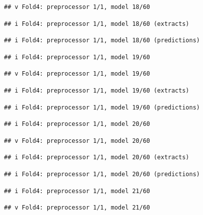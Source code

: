 \documentclass[
]{article}
\begin{document}
\begin{verbatim}
## v Fold4: preprocessor 1/1, model 18/60
\end{verbatim}

\begin{verbatim}
## i Fold4: preprocessor 1/1, model 18/60 (extracts)
\end{verbatim}

\begin{verbatim}
## i Fold4: preprocessor 1/1, model 18/60 (predictions)
\end{verbatim}

\begin{verbatim}
## i Fold4: preprocessor 1/1, model 19/60
\end{verbatim}

\begin{verbatim}
## v Fold4: preprocessor 1/1, model 19/60
\end{verbatim}

\begin{verbatim}
## i Fold4: preprocessor 1/1, model 19/60 (extracts)
\end{verbatim}

\begin{verbatim}
## i Fold4: preprocessor 1/1, model 19/60 (predictions)
\end{verbatim}

\begin{verbatim}
## i Fold4: preprocessor 1/1, model 20/60
\end{verbatim}

\begin{verbatim}
## v Fold4: preprocessor 1/1, model 20/60
\end{verbatim}

\begin{verbatim}
## i Fold4: preprocessor 1/1, model 20/60 (extracts)
\end{verbatim}

\begin{verbatim}
## i Fold4: preprocessor 1/1, model 20/60 (predictions)
\end{verbatim}

\begin{verbatim}
## i Fold4: preprocessor 1/1, model 21/60
\end{verbatim}

\begin{verbatim}
## v Fold4: preprocessor 1/1, model 21/60
\end{verbatim}
\end{document}
